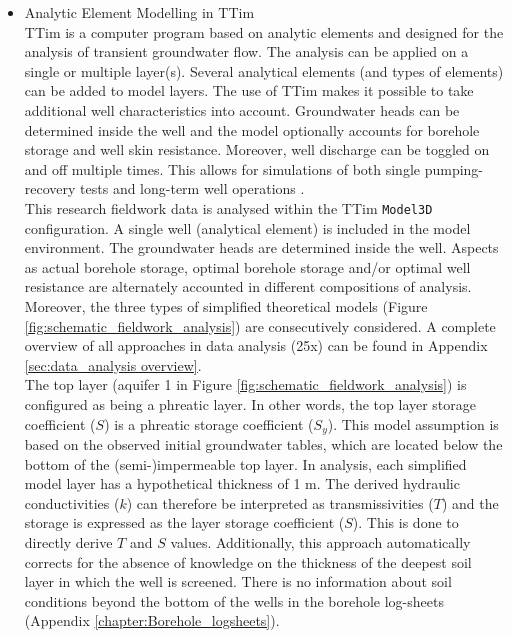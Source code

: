 \begin{itemize}
\item{Analytic Element Modelling in TTim} \\
TTim is a computer program based on analytic elements and designed for the analysis of transient groundwater flow. The analysis can be applied on a single or multiple layer(s). Several analytical elements (and types of elements) can be added to model layers. The use of TTim makes it possible to take additional well characteristics into account. Groundwater heads can be determined inside the well and the model optionally accounts for borehole storage and well skin resistance. Moreover, well discharge can be toggled on and off multiple times. This allows for simulations of both single pumping-recovery tests and long-term well operations \citep{Mishra2013,Bakker2013}. \\

This research fieldwork data is analysed within the TTim \texttt{Model3D} configuration. A single well (analytical element) is included in the model environment. The groundwater heads are determined inside the well. Aspects as actual borehole storage, optimal borehole storage and/or optimal well resistance are alternately accounted in different compositions of analysis. Moreover, the three types of simplified theoretical models (Figure \ref{fig:schematic_fieldwork_analysis}) are consecutively considered. A complete overview of all approaches in data analysis (25x) can be found in Appendix \ref{sec:data_analysis overview}. \\

The top layer (aquifer 1 in Figure \ref{fig:schematic_fieldwork_analysis}) is configured as being a phreatic layer. In other words, the top layer storage coefficient ($S$) is a phreatic storage coefficient ($S_y$). This model assumption is based on the observed initial groundwater tables, which are located below the bottom of the (semi-)impermeable top layer. In analysis, each simplified model layer has a hypothetical thickness of 1 m. The derived hydraulic conductivities ($k$) can therefore be interpreted as transmissivities ($T$) and the storage is expressed as the layer storage coefficient ($S$). This is done to directly derive $T$ and $S$ values. Additionally, this approach automatically corrects for the absence of knowledge on the thickness of the deepest soil layer in which the well is screened. There is no information about soil conditions beyond the bottom of the wells in the borehole log-sheets (Appendix \ref{chapter:Borehole_logsheets}). \\
\end{itemize} 

